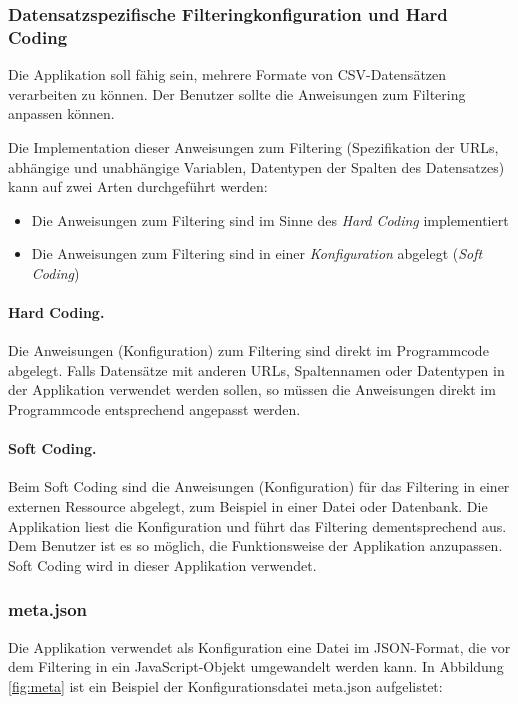 \subsubsection{Datensatzspezifische Filteringkonfiguration und Hard Coding}

Die Applikation soll fähig sein, mehrere Formate von CSV-Datensätzen verarbeiten zu können. Der Benutzer sollte die Anweisungen zum Filtering anpassen können.

Die Implementation dieser Anweisungen zum Filtering (Spezifikation der URLs, abhängige und unabhängige Variablen, Datentypen der Spalten des Datensatzes) kann auf zwei Arten durchgeführt werden:

\begin{itemize}
	\item Die Anweisungen zum Filtering sind im Sinne des \textit{Hard Coding} implementiert
	\item Die Anweisungen zum Filtering sind in einer \textit{Konfiguration} abgelegt (\textit{Soft Coding})
\end{itemize}

\paragraph{Hard Coding.} Die Anweisungen (Konfiguration) zum Filtering sind direkt im Programmcode abgelegt. Falls Datensätze mit anderen URLs, Spaltennamen oder Datentypen in der Applikation verwendet werden sollen, so müssen die Anweisungen direkt im Programmcode entsprechend angepasst werden.

\paragraph{Soft Coding.} Beim Soft Coding sind die Anweisungen (Konfiguration) für das Filtering in einer externen Ressource abgelegt, zum Beispiel in einer Datei oder Datenbank. Die Applikation liest die Konfiguration und führt das Filtering dementsprechend aus. Dem Benutzer ist es so möglich, die Funktionsweise der Applikation anzupassen. Soft Coding wird in dieser Applikation verwendet.

\subsubsection{meta.json}

Die Applikation verwendet als Konfiguration eine Datei im JSON-Format, die vor dem Filtering in ein JavaScript-Objekt umgewandelt werden kann. In Abbildung \ref{fig:meta} ist ein Beispiel der Konfigurationsdatei meta.json aufgelistet:


